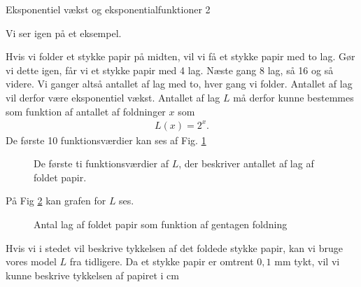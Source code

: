 
\begin{center}
\Huge
Eksponentiel vækst og eksponentialfunktioner 2
\end{center}
Vi ser igen på et eksempel.
\begin{exa}\label{exa:exa1}
Hvis vi folder et stykke papir på midten, vil vi få et stykke papir med to lag. Gør vi dette igen, får vi et stykke papir med 4 lag. Næste gang 8 lag, så 16 og så videre. Vi ganger altså antallet af lag med to, hver gang vi folder. Antallet af lag vil derfor være eksponentiel vækst. Antallet af lag $L$ må derfor kunne bestemmes som funktion af antallet af foldninger $x$ som
\begin{align*}
L(x) = 2^x.
\end{align*}
De første 10 funktionsværdier kan ses af Fig. \ref{fig:sildebenfold}
\begin{figure}[H]
\center
{}
\caption{De første ti funktionsværdier af $L$, der beskriver antallet af lag af foldet papir.}
\label{fig:sildebenfold}
\end{figure}
På Fig \ref{fig:flagxfold} kan grafen for $L$ ses. 
\begin{figure}[H]
\center
{}
\caption{Antal lag af foldet papir som funktion af gentagen foldning}
\label{fig:flagxfold}
\end{figure}
Hvis vi i stedet vil beskrive tykkelsen af det foldede stykke papir, kan vi bruge vores model $L$ fra tidligere. Da et stykke papir er omtrent $0,1$ mm tykt, vil vi kunne beskrive tykkelsen af papiret i cm
\begin{align*}

\end{align*}
\end{exa}
